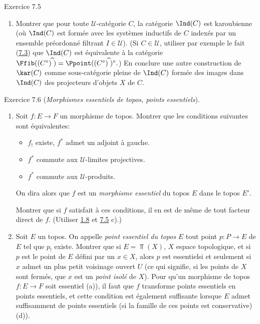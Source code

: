 \begin{enonce*}[remark]{Exercice 7.5}
\begin{enumerate}
\item Montrer que pour toute $𝒰$-catégorie $C$, la catégorie
$\Ind(C)$ est karoubienne (où $\Ind(C)$ est formée avec les systèmes
inductifs de $C$ indexés par un ensemble préordonné filtrant $I\in
𝒰$). (Si $C\in 𝒰$, utiliser par exemple le fait
(\hyperref[IV.subsec7.3]{7.3}) que $\Ind(C)$ est équivalente à la catégorie
$\Ffib((C^{\circ})^{\widehat{\phantom{,}}})=\Ppoint((C^{\circ})^{\widehat{\phantom{,}}})^{\circ}.$)
En conclure une autre construction de $\kar(C)$ comme sous-catégorie
pleine de $\Ind(C)$ formée des images dans $\Ind(C)$ des projecteurs
d'objets $X$ de $C$.
\end{enumerate}
\end{enonce*}

\begin{enonce*}[remark]{Exercice 7.6}
(\emph{Morphismes essentiels de topos, points essentiels}).
\begin{enumerate}
\renewcommand{\theenumi}{\alph{enumi}}
\renewcommand{\labelenumi}{\theenumi)}
\item Soit $f:E\rightarrow F$ un morphisme de topos. Montrer que les
conditions suivantes sont équivalentes:
\begin{itemize}
\item[i)] $f_{!}$ existe, \ie $f^{\ast}$ admet un adjoint à gauche.

\item[ii)] $f^{\ast}$ commute aux $𝒰$-limites projectives.

\item[${\rm ii')}$] $f^{\ast}$ commute aux $𝒰$-produits.
\end{itemize}
On dira alors que $f$ est un \emph{morphisme essentiel} du topos $E$
dans le topos $E'$.

Montrer que si $f$ satisfait à ces conditions, il en est de même de
tout facteur direct de $f$. (Utiliser \hyperref[IV.rem1.8]{1.8} et
\hyperref[IV.exer7.5]{7.5} c).)

\item Soit $E$ un topos. On appelle \emph{point essentiel du topos}
$E$ tout point $p:P\rightarrow E$ de $E$ tel que $p_{!}$ existe.
Montrer que si $E=\Top(X)$, $X$ espace topologique, et si $p$ est le
point de $E$ défini par un $x\in X$, alors $p$ est
essentiel\pageoriginale si et seulement si $x$ admet un plus petit
voisinage ouvert $U$ (ce qui signifie, si les points de $X$ sont
fermés, que $x$ est un \emph{point isolé} de $X$). Pour qu'un
morphisme de topos $f:E\rightarrow F$ soit essentiel (a)), il faut
que $f$ transforme points essentiels en points essentiels, et cette
condition est également suffisante lorsque $E$ admet suffisamment de
points essentiels (\ie si la famille de ces points est conservative)
(\cf d)).


\end{enumerate}
\end{enonce*}
